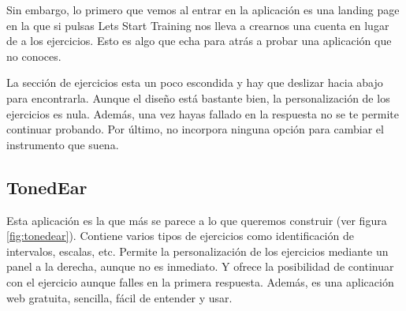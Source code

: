 \documentclass[12pt,twoside,titlepage]{report}
\begin{document}
Sin embargo, lo primero que vemos al entrar en la aplicación es una landing page en la que si pulsas Lets Start Training nos lleva a crearnos una cuenta en lugar de a los ejercicios. Esto es algo que echa para atrás a probar una aplicación que no conoces. 
\cite{tonegym2}

La sección de ejercicios esta un poco escondida y hay que deslizar hacia abajo para encontrarla. Aunque el diseño está bastante bien, la personalización de los ejercicios es nula. Además, una vez hayas fallado en la respuesta no se te permite continuar probando. Por último, no incorpora ninguna opción para cambiar el instrumento que suena.
\cite{tonegym3}

\subsection{TonedEar}
\label{sec:TonedEar}

Esta aplicación es la que más se parece a lo que queremos construir (ver figura \ref{fig:tonedear}). Contiene varios tipos de ejercicios como identificación de intervalos, escalas, etc. Permite la personalización de los ejercicios mediante un panel a la derecha, aunque no es inmediato. Y ofrece la posibilidad de continuar con el ejercicio aunque falles en la primera respuesta. Además, es una aplicación web gratuita, sencilla, fácil de entender y usar.
\cite{tonedear1}
\end{document}
